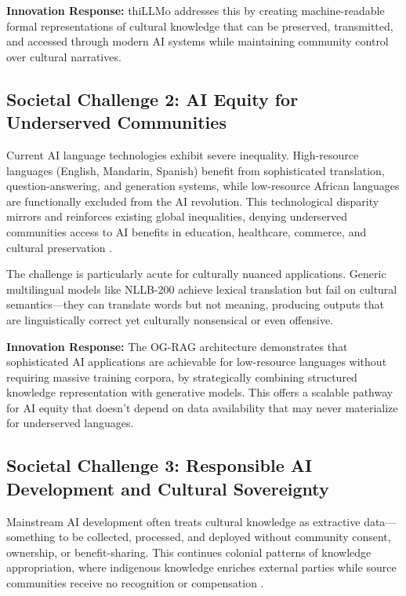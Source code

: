 \documentclass[a4paper,11pt]{article}
\begin{document}
\textbf{Innovation Response:} thiLLMo addresses this by creating machine-readable formal representations of cultural knowledge that can be preserved, transmitted, and accessed through modern AI systems while maintaining community control over cultural narratives.

\subsection{Societal Challenge 2: AI Equity for Underserved Communities}

Current AI language technologies exhibit severe inequality. High-resource languages (English, Mandarin, Spanish) benefit from sophisticated translation, question-answering, and generation systems, while low-resource African languages are functionally excluded from the AI revolution. This technological disparity mirrors and reinforces existing global inequalities, denying underserved communities access to AI benefits in education, healthcare, commerce, and cultural preservation \cite{joshi2020state}.

The challenge is particularly acute for culturally nuanced applications. Generic multilingual models like NLLB-200 \cite{costa2022no} achieve lexical translation but fail on cultural semantics—they can translate words but not meaning, producing outputs that are linguistically correct yet culturally nonsensical or even offensive.

\textbf{Innovation Response:} The OG-RAG architecture demonstrates that sophisticated AI applications are achievable for low-resource languages without requiring massive training corpora, by strategically combining structured knowledge representation with generative models. This offers a scalable pathway for AI equity that doesn't depend on data availability that may never materialize for underserved languages.

\subsection{Societal Challenge 3: Responsible AI Development and Cultural Sovereignty}

Mainstream AI development often treats cultural knowledge as extractive data—something to be collected, processed, and deployed without community consent, ownership, or benefit-sharing. This continues colonial patterns of knowledge appropriation, where indigenous knowledge enriches external parties while source communities receive no recognition or compensation \cite{mohamed2020decolonial}.
\end{document}
